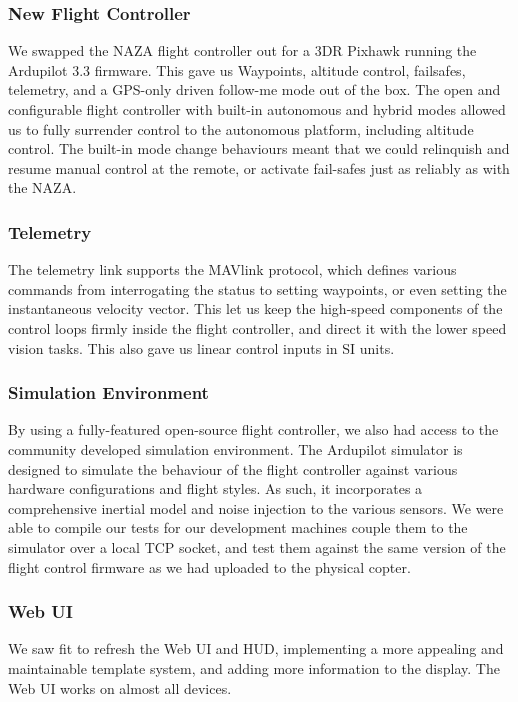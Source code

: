 \documentclass{article}
\begin{document}
    \subsubsection{New Flight Controller}
      We swapped the NAZA flight controller out for a 3DR Pixhawk running the Ardupilot 3.3 firmware.  This gave us Waypoints, altitude control, failsafes, telemetry, and a GPS-only driven follow-me mode out of the box.
      The open and configurable flight controller with built-in autonomous and hybrid modes allowed us to fully surrender control to the autonomous platform, including altitude control.  The built-in mode change behaviours meant that we could relinquish and resume manual control at the remote, or activate fail-safes just as reliably as with the NAZA.
      
    \subsubsection{Telemetry}
      The telemetry link supports the MAVlink protocol, which defines various commands from interrogating the status to setting waypoints, or even setting the instantaneous velocity vector.
      This let us keep the high-speed components of the control loops firmly inside the flight controller, and direct it with the lower speed vision tasks.  This also gave us linear control inputs in SI units.

    \subsubsection{Simulation Environment}
      By using a fully-featured open-source flight controller, we also had access to the community developed simulation environment.  
      The Ardupilot simulator is designed to simulate the behaviour of the flight controller against various hardware configurations and flight styles.  As such, it incorporates a comprehensive inertial model and noise injection to the various sensors.
      We were able to compile our tests for our development machines couple them to the simulator over a local TCP socket, and test them against the same version of the flight control firmware as we had uploaded to the physical copter.


    \subsubsection{Web UI}
      We saw fit to refresh the Web UI and HUD, implementing a more appealing and maintainable template system, and adding more information to the display.
      The Web UI works on almost all devices.
\end{document}
